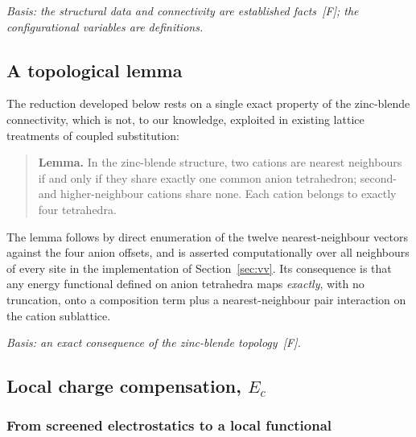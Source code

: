 \documentclass[11pt,a4paper]{article}
\begin{document}
\textit{Basis: the structural data and connectivity are established facts~[F];
the configurational variables are definitions.}

\subsection{A topological lemma}
\label{sec:lemma}

The reduction developed below rests on a single exact property of the
zinc-blende connectivity, which is not, to our knowledge, exploited in existing
lattice treatments of coupled substitution:

\begin{quote}
\textbf{Lemma.} In the zinc-blende structure, two cations are nearest neighbours
if and only if they share exactly one common anion tetrahedron; second- and
higher-neighbour cations share none. Each cation belongs to exactly four
tetrahedra.
\end{quote}

The lemma follows by direct enumeration of the twelve nearest-neighbour vectors
against the four anion offsets, and is asserted computationally over all
neighbours of every site in the implementation of Section~\ref{sec:vv}. Its
consequence is that any energy functional defined on anion tetrahedra maps
\emph{exactly}, with no truncation, onto a composition term plus a
nearest-neighbour pair interaction on the cation sublattice.

\textit{Basis: an exact consequence of the zinc-blende topology~[F].}

\subsection{Local charge compensation, \texorpdfstring{$E_c$}{Ec}}

\subsubsection{From screened electrostatics to a local functional}
\end{document}
